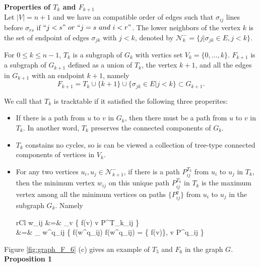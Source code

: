 \documentclass[a4paper,12pt]{article}
\numberwithin{equation}{section}
\DeclareMathOperator*{\argmin}{arg\,min}
\DeclareMathOperator*{\argmax}{arg\,max}
\begin{document}
	\noindent \textbf{Properties of $T_k$ and $F_{k+1}$}\\
	
	Let $\vert V \vert = n+1$ and we have an compatible order of edges such that $\sigma_{ij}$ lines before $\sigma_{rs}$ if $``j<s" \  or \  ``j=s \ and \ i<r"$.	The lower neighbors of the vertex $k$ is the set of endpoint of edges $\sigma_{jk}$ with $j<k$, denoted by $\mathcal{N}^{-}_{k} = \{j \vert \sigma_{jk} \in E, j<k \}$.
	
	For $0\leq k \leq n-1$, $T_k$ is a subgraph of $G_k$ with vertics set $V_k = \{0,\ldots, k\}$.  $F_{k+1}$ is a subgraph of $G_{k+1}$ defined as a union of $T_k$, the vertex ${k+1}$, and all the edges in $G_{k+1}$ with an endpoint $k+1$, namely
	$$ F_{k+1} = T_k \cup \{k+1\} \cup \{ \sigma_{jk} \in E \vert j<k \} \subset G_{k+1}.$$	
	
	We call that $T_k$ is tracktable if it satisfied the following three properites:
	\begin{itemize}
	 \item If there is a path from $u$ to $v$ in $G_k$, then there must be a path from $u$ to $v$ in $T_k$. In another word, $T_k$ preserves the connected components of $G_k$.
	 
	 \item $T_k$ constains no cycles, so is can be viewed a collection of tree-type connected components of vertices in $V_k$.
	 
	 \item For any two vertices $u_i,u_j \in \mathcal{N}^{-}_{k+1}$, if there is a path $P^{T_k}_{ij}$ from $u_i$ to $u_j$ in $T_k$, then the minimum vertex $w_{ij}$ on this unique path $P^{T_k}_{ij}$ in $T_k$ is the maximum vertex among all the minimum vertices on paths $\{P^q_{ij}\}$ from $u_i$ to $u_j$ in the subgraph $G_k$.	 Namely
	  \begin{IEEEeqnarray*}{rCl}
	    w_{ij} &=& \argmin_{v} \{ f(v) \vert v \in P^{T_k}_{ij} \} \\
	    &=& \argmax_{ w^q_{ij} } \{ f(w^q_{ij}) \vert f(w^q_{ij}) = \min \{ f(v)\}, \forall v \in P^q_{ij} \}
	  \end{IEEEeqnarray*}
	\end{itemize}

	Figure \ref{fig:graph_F_6} (c) gives an example of $T_5$ and $F_6$ in the graph $G$.\\
	
	\noindent \textbf{Proposition 1} 
	
\end{document}

